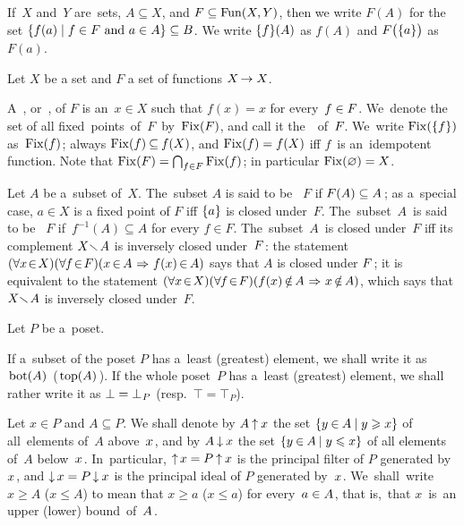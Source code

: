 \documentclass[11pt,letterpaper]{article}
\begin{document}
If~$X$ and~$Y$ are~sets, $A\subseteq X$, and $F\subseteq\mathop{\smash{\mathrm{Fun}}}\nolimits(X,Y)$,
then we write $F(A)$ for the set $\{ f(a)\mid \text{$f\in F$ and $a\in A$} \}\subseteq B$.
We write $\{ f \}(A)$ as $f(A)$ and $F\bigl(\{ a \}\bigr)$ as~$F(a)$.

\txtskip

Let $X$ be a set and $F$ a set of functions $X\mspace{-2mu}\to X$.

A~, or~, of $F$
	is an~$x\in X$ such that $f(x) = x$ for every~$f\in\nolinebreak F$.
We~denote the set of all fixed~points~of~$F$~by~$\mathop{\smash{\mathrm{Fix}}}\nolimits(F)$,
	and call it the~~of~$F\mspace{-1mu}$.
We~write $\mathop{\smash{\mathrm{Fix}}}\nolimits(\{ f \})$ as~$\mathop{\smash{\mathrm{Fix}}}\nolimits(f)\mspace{1mu}$;
always $\mathop{\smash{\mathrm{Fix}}}\nolimits(f)\mspace{-1mu}\subseteq\mspace{-1mu} f(X)$, and $\mathop{\smash{\mathrm{Fix}}}\nolimits(f) = f(X)$ iff $f$~is an~idempotent function.
Note that $\mathop{\smash{\mathrm{Fix}}}\nolimits(F) = \bigcap_{f\in F}\mathop{\smash{\mathrm{Fix}}}\nolimits(f)\mspace{1mu}$; in particular $\mathop{\smash{\mathrm{Fix}}}\nolimits(\mathord{\varnothing}) = X$.

Let $A$ be a~subset of~$X$.
The~subset $A$ is said to be ~$F$ if $F(A)\subseteq A\mspace{2mu}$;
as a~special case, $a\in X$ is a fixed point of $F$ iff $\{ a \}$ is closed under~$F$.
%
The~subset~$A$~is said to be ~$F$
	if~$f^{-1}(A)\subseteq A$ for every $f\in F$.
The~subset~$A$~is closed under~$F$
iff its complement $X\negdtinysp\narrdt\setdiff A$ is inversely closed under~$F\mspace{1mu}$:
the statement
    $(\forall x\!\in\! X)(\forall\mspace{-1mu} f\!\in\! F)
		(x\mspace{-2mu}\in\mspace{-2mu} A\mspace{1mu}\mathrel{\Rightarrow}\mspace{1mu} f(x)\mspace{-2mu}\in\mspace{-2mu} A)$
says that $A$ is closed under $F\mspace{1mu}$;
it is equivalent to the statement
    $(\forall x\!\in\! X)(\forall\mspace{-1mu} f\!\in\! F)
		(f(x)\mspace{-2mu}\notin\mspace{-2mu} A \mspace{1mu}\mathrel{\Rightarrow}\mspace{1mu} x\mspace{-2mu}\notin\mspace{-2mu} A)$,
which says that $X\negdtinysp\narrdt\setdiff A$ is inversely closed under~$F$.

\txtskip

Let $P$ be a~poset.

If a~subset of the poset $P$ has a~least (greatest) element, we shall write it
	as $\mspace{2mu}\mathop{\smash{\mathrm{bot}}}\nolimits(A)\mspace{2mu}$ {\large(}$\mspace{2mu}\mathop{\smash{\mathrm{top}}}\nolimits(A)\mspace{2mu}${\large)}.
If the whole poset~$P$ has a~least (greatest) element, we shall rather write it
	as $\bot = \bot_{\mspace{1mu} P}\mspace{1mu}$ {\large(}resp.\ $\top = \top_{\!P}${\large)}.

Let $x\in P$ and $A\subseteq P$.
We shall denote by $A\mathbin{\uparrow} x$ the set $\{ y\mspace{-1mu}\in\mspace{-1mu} A\mspace{-1mu}\mid y\geqslant x \}$
	of all~ele\-ments of~$A$ above~$x\mspace{1mu}$,
and by $A\mathbin{\downarrow} x$ the set $\{ y\mspace{-1mu}\in\mspace{-1mu} A\mspace{-1mu}\mid y\leqslant x \}$
	of all elements of~$A$ below~$x\mspace{1mu}$.
In~particular, $\mathop{\smash{\uparrow}}\nolimits x = P\mathbin{\uparrow} x$ is the principal filter of $P$ generated by~$x\mspace{1mu}$,
and $\mathop{\smash{\downarrow}}\nolimits x = P\mspace{-1mu}\mathbin{\downarrow} x$ is the principal ideal of $P$ generated by~$x\mspace{1mu}$.
We~shall~write~$x\geq A$ ($x\leq A$) to mean that $x\geq a$ ($x\leq a$) for every~$a\in A\mspace{1mu}$,
	that is,~that $x$~is~an upper (lower) bound~of~$A\mspace{1mu}$.
\end{document}
